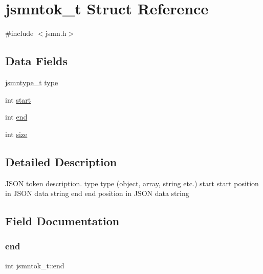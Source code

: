 \hypertarget{structjsmntok__t}{}\section{jsmntok\+\_\+t Struct Reference}
\label{structjsmntok__t}


{\ttfamily \#include $<$jsmn.\+h$>$}

\subsection*{Data Fields}
\begin{DoxyCompactItemize}
\item 
\mbox{\hyperlink{jsmn_8h_a065320719769f9dc1fbe30094e52802f}{jsmntype\+\_\+t}} \mbox{\hyperlink{structjsmntok__t_ac03dbd6b83cbcd979eb64702d5b9943e}{type}}
\item 
int \mbox{\hyperlink{structjsmntok__t_a0a8f55d0095f268ce8e224fe1234acd0}{start}}
\item 
int \mbox{\hyperlink{structjsmntok__t_ab49e0369f39e9b6174141e7f5bde5996}{end}}
\item 
int \mbox{\hyperlink{structjsmntok__t_a8ac3694b7335456c8e602197778883db}{size}}
\end{DoxyCompactItemize}


\subsection{Detailed Description}
J\+S\+ON token description. type type (object, array, string etc.) start start position in J\+S\+ON data string end end position in J\+S\+ON data string 

\subsection{Field Documentation}
\mbox{\label{structjsmntok__t_ab49e0369f39e9b6174141e7f5bde5996}} 
\subsubsection{\texorpdfstring{end}{end}}
{\footnotesize\ttfamily int jsmntok\+\_\+t\+::end}

\mbox{\label{structjsmntok__t_a8ac3694b7335456c8e602197778883db}} 
